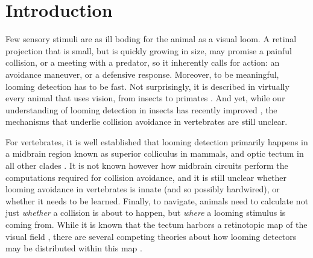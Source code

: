 \documentclass{article}
\begin{document}
\section*{Introduction}


Few sensory stimuli are as ill boding for the animal as a visual loom. A retinal projection that is small, but is quickly growing in size, may promise a painful collision, or a meeting with a predator, so it inherently calls for action: an avoidance maneuver, or a defensive response. Moreover, to be meaningful, looming detection has to be fast. Not surprisingly, it is described in virtually every animal that uses vision, from insects to primates \citep{Pereira2016}. And yet, while our understanding of looming detection in insects has recently improved \citep{rind2016locust,von2017fruitfly}, the mechanisms that underlie collision avoidance in vertebrates are still unclear.

For vertebrates, it is well established that looming detection primarily happens in a midbrain region known as superior colliculus in mammals, and optic tectum in all other clades \citep{frost2004review, liu2011cat, khakhalin2014, dunn2016escapesZF}. It is not known however how midbrain circuits perform the computations required for collision avoidance, and it is still unclear whether looming avoidance in vertebrates is innate (and so possibly hardwired), or whether it needs to be learned. Finally, to navigate, animals need to calculate not just \textit{whether} a collision is about to happen, but \textit{where} a looming stimulus is coming from. While it is known that the tectum harbors a retinotopic map of the visual field \citep{mclaughlin2003retinotopic, ruthazer2004map}, there are several competing theories about how looming detectors may be distributed within this map \citep{frost2004review}.
\end{document}
